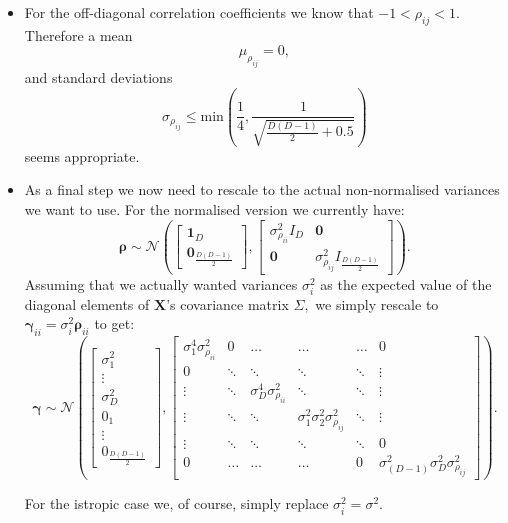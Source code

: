 \begin{itemize}
\item For the off-diagonal correlation coefficients we know that $-1<\rho_{ij}<1$.
Therefore a mean
\begin{equation}
\mu_{\rho_{ij}}=0,
\end{equation}
and standard deviations
\begin{equation}
\sigma_{\rho_{ij}}\leq\text{min}(\frac{1}{4},\frac{1}{\sqrt{\frac{D(D-1)}{2}+0.5}})
\end{equation}
 seems appropriate.
\item As a final step we now need to rescale to the actual non-normalised
variances we want to use. For the normalised version we currently
have:
\[
\mathbf{\rho}\sim\mathcal{N}\left(\left[\begin{array}{c}
\mathbf{1}_{D}\\
\mathbf{0}_{\frac{D(D-1)}{2}}
\end{array}\right],\left[\begin{array}{cc}
\sigma_{\rho_{ii}}^{2}I_{D} & \mathbf{0}\\
\mathbf{0} & \sigma_{\rho_{ij}}^{2}I_{\frac{D(D-1)}{2}}
\end{array}\right]\right).
\]
Assuming that we actually wanted variances $\sigma_{i}^{2}$ as the
expected value of the diagonal elements of $\mathbf{X}$'s covariance
matrix $\Sigma,$ we simply rescale to $\mathbf{\gamma}_{ii}=\sigma_{i}^{2}\mathbf{\rho}_{ii}$
to get:
\begin{equation}
\mathbf{\gamma}\sim\mathcal{N}\left(\left[\begin{array}{c}
\sigma_{1}^{2}\\
\vdots\\
\sigma_{D}^{2}\\
0_{1}\\
\vdots\\
0_{\frac{D(D-1)}{2}}
\end{array}\right],\left[\begin{array}{cccccc}
\sigma_{1}^{4}\sigma_{\rho_{ii}}^{2} & 0 & \hdots & \hdots & \hdots & 0\\
0 & \ddots & \ddots & \ddots & \ddots & \vdots\\
\vdots & \ddots & \sigma_{D}^{4}\sigma_{\rho_{ii}}^{2} & \ddots & \ddots & \vdots\\
\vdots & \ddots & \ddots & \sigma_{1}^{2}\sigma_{2}^{2}\sigma_{\rho_{ij}}^{2} & \ddots & \vdots\\
\vdots & \ddots & \ddots & \ddots & \ddots & 0\\
0 & \hdots & \hdots & \hdots & 0 & \sigma_{(D-1)}^{2}\sigma_{D}^{2}\sigma_{\rho_{ij}}^{2}
\end{array}\right]\right).
\end{equation}



For the istropic case we, of course, simply replace $\sigma_{i}^{2}=\sigma^{2}$.

\end{itemize}


